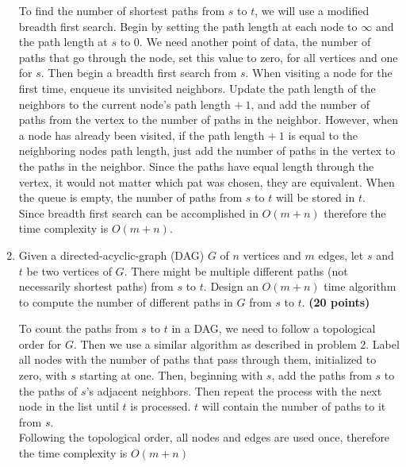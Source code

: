 \documentclass[11pt]{article}
\begin{document}
\begin{enumerate}
\begin{tcolorbox}
  To find the number of shortest paths from $s$ to $t$, we will use a modified
  breadth first search. Begin by setting the path length at each node to $\infty$
  and the path length at $s$ to $0$. We need another point of data, the
  number of paths that go through the node, set this value to zero, for all
  vertices and one for $s$. Then begin a breadth first search from $s$.
  When visiting a node for the first time, enqueue
  its unvisited neighbors. Update the path length of the neighbors to the current node's path
  length $+\ 1$, and add the number of paths from the vertex to the number of paths in the neighbor.
  However, when a node has already been visited, if the path length $+\ 1$ is
  equal to the neighboring nodes path length, just add the number of paths
  in the vertex to the paths in the neighbor. Since the paths have equal length through the vertex,
  it would not matter which pat was chosen, they are equivalent. When the queue is empty,
  the number of paths from $s$ to $t$ will be stored in $t$.\\

  Since breadth first search can be accomplished in $O(m + n)$ therefore the time
  complexity is $O(m+n)$.

\end{tcolorbox}

\newpage
  \item %
Given a directed-acyclic-graph (DAG) $G$ of $n$ vertices and $m$ edges,
let $s$ and $t$ be two vertices of $G$. There might be multiple different paths (not necessarily shortest paths) from $s$ to $t$.
Design an $O(m+n)$ time algorithm to compute the number of different paths in $G$ from $s$ to $t$. {\hfill \bf (20 points)}

\begin{tcolorbox}

  To count the paths from $s$ to $t$ in a DAG, we need to follow a topological
  order for $G$. Then we use a similar algorithm as described in problem 2.
  Label all nodes with the number of paths that pass through them, initialized to
  zero, with $s$ starting at one. Then, beginning with $s$, add the paths from $s$
  to the paths of $s$'s adjacent neighbors. Then repeat the process with the next
  node in the list until $t$ is processed. $t$ will contain the number of paths
  to it from $s$.\\

  Following the topological order, all nodes and edges are used once,
  therefore the time complexity is $O(m+n)$


\end{tcolorbox}
\end{enumerate}
\end{document}
